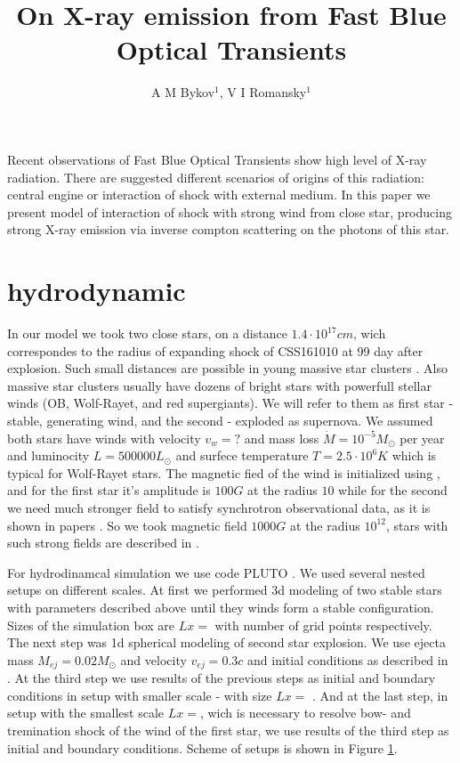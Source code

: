 \documentclass[a4paper,12pt]{extreport}
\begin{document}
	\title{On X-ray emission from Fast Blue Optical Transients}
	
	\author{A M Bykov$^{1}$, V I Romansky$^{1}$}
	

Recent observations of Fast Blue Optical Transients \cite{Margutti2019,Ho2020,Coppejans2020} show high level of X-ray radiation. There are suggested different scenarios of  origins of this radiation: central engine or interaction of shock with external medium. In this paper we present model of interaction of shock with strong wind from close star, producing strong X-ray emission via inverse compton scattering on the photons of this star.

\section{hydrodynamic}
In our model we took two close stars, on a distance $1.4\cdot10^{17} cm$, wich correspondes to the radius of expanding shock of CSS161010 at 99 day after explosion. Such small distances are possible in young massive star clusters \cite{}. Also massive star clusters usually have dozens of bright stars with powerfull stellar winds (OB, Wolf-Rayet, and red supergiants). We will refer to them as first star - stable, generating wind, and the second - exploded as supernova. We assumed both stars have winds with velocity $v_w = ?$ and mass loss $\dot{M} = 10^{-5} M_\odot $ per year and luminocity $L=500000 L_\odot$ and surfece temperature $T = 2.5\cdot10^6 K$ which is typical for Wolf-Rayet stars. The magnetic fied of the wind is initialized using \cite{}, and for the first star  it's amplitude is $100 G$ at the radius $10$ while for the second we need much stronger field to satisfy synchrotron observational data, as it is shown in papers \cite{Coppejans2020, BykovUniverse}. So we took magnetic field $1000 G$ at the radius $10^{12}$, stars with such strong fields are described in \cite{}.

For hydrodinamcal simulation we use code PLUTO \cite{MignonePluto}. We used several nested setups on different scales. At first we performed 3d modeling of two stable stars with parameters described above until they winds form a stable configuration. Sizes of the simulation box are $Lx = $ with number of grid points respectively. The next step was 1d spherical modeling of second star explosion. We use ejecta mass $M_{ej} = 0.02 M_\odot$ and velocity $v_{ej} = 0.3 c$ and initial conditions as described in \cite{}. At the third step we use results of the previous steps as initial and boundary conditions in setup with smaller scale - with size $Lx = $ . And at the last step, in setup with the smallest scale $Lx = $, wich is necessary to resolve bow- and tremination shock of the wind of the first star, we use results of the third step as initial and boundary conditions. Scheme of setups is shown in Figure \ref{}.
\end{document}
